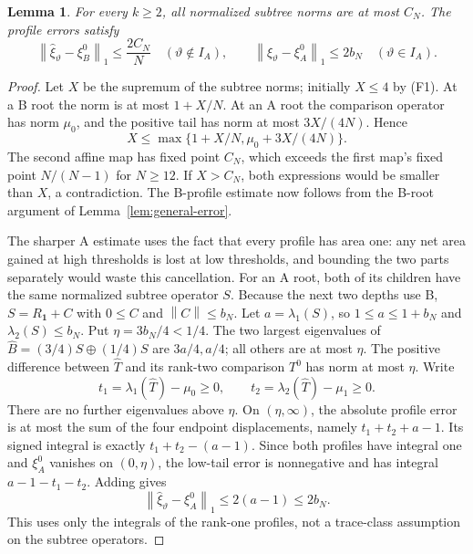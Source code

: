 \documentclass[11pt]{article}
\newtheorem{lemma}[theorem]{Lemma}
\theoremstyle{definition}
\theoremstyle{remark}
\newcommand{\one}{\mathbf 1}
\newcommand{\norm}[1]{\left\lVert #1\right\rVert}
\begin{document}
\begin{lemma}\label{lem:profiles}
For every $k\ge2$, all normalized subtree norms are at most $C_N$.
The profile errors satisfy
\[
 \norm{\widehat\xi_\vartheta-\xi_B^0}_1\le\frac{2C_N}{N}
 \quad(\vartheta\notin I_A),\qquad
 \norm{\widehat\xi_\vartheta-\xi_A^0}_1\le2b_N
 \quad(\vartheta\in I_A).
\]
\end{lemma}
\begin{proof}
Let $X$ be the supremum of the subtree norms; initially $X\le4$ by
(F1). At a B root the norm is at most $1+X/N$. At an A root the
comparison operator has norm $\mu_0$, and the positive tail has norm
at most $3X/(4N)$. Hence
\[
 X\le\max\{1+X/N,\mu_0+3X/(4N)\}.
\]
The second affine map has fixed point $C_N$, which exceeds the first
map's fixed point $N/(N-1)$ for $N\ge12$. If $X>C_N$, both expressions
would be smaller than $X$, a contradiction. The B-profile estimate
now follows from the B-root argument of Lemma~\ref{lem:general-error}.

The sharper A estimate uses the fact that every profile has area one:
any net area gained at high thresholds is lost at low thresholds, and
bounding the two parts separately would waste this cancellation.
For an A root, both of its children have the same normalized subtree
operator $S$. Because the next two depths use B, $S=R_\one+C$ with
$0\le C$ and $\norm C\le b_N$. Let $a=\lambda_1(S)$, so
$1\le a\le1+b_N$ and $\lambda_2(S)\le b_N$. Put $\eta=3b_N/4<1/4$.
The two largest eigenvalues of
$\widehat B=(3/4)S\oplus(1/4)S$ are $3a/4,a/4$; all others are at
most $\eta$. The positive difference between $\widehat T$ and its
rank-two comparison $T^0$ has norm at most $\eta$. Write
\[
 t_1=\lambda_1(\widehat T)-\mu_0\ge0,\qquad
 t_2=\lambda_2(\widehat T)-\mu_1\ge0.
\]
There are no further eigenvalues above $\eta$. On $(\eta,\infty)$,
the absolute profile error is at most the sum of the four endpoint
displacements, namely $t_1+t_2+a-1$. Its signed integral is exactly
$t_1+t_2-(a-1)$. Since both profiles have integral one and $\xi_A^0$
vanishes on $(0,\eta)$, the low-tail error is nonnegative and has
integral $a-1-t_1-t_2$. Adding gives
\[
 \norm{\widehat\xi_\vartheta-\xi_A^0}_1\le2(a-1)\le2b_N.
\]
This uses only the integrals of the rank-one profiles, not a trace-class
assumption on the subtree operators.
\end{proof}
\end{document}
